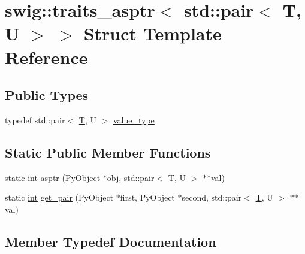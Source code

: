 \hypertarget{structswig_1_1traits__asptr_3_01std_1_1pair_3_01_t_00_01_u_01_4_01_4}{}\section{swig\+:\+:traits\+\_\+asptr$<$ std\+:\+:pair$<$ T, U $>$ $>$ Struct Template Reference}
\label{structswig_1_1traits__asptr_3_01std_1_1pair_3_01_t_00_01_u_01_4_01_4}
\subsection*{Public Types}
\begin{DoxyCompactItemize}
\item 
typedef std\+::pair$<$ \hyperlink{fmt_8h_a0acb682b8260ab1c60b918599864e2e5}{T}, U $>$ \hyperlink{structswig_1_1traits__asptr_3_01std_1_1pair_3_01_t_00_01_u_01_4_01_4_a1cc2b1f24022176235ac0ede7646c041}{value\+\_\+type}
\end{DoxyCompactItemize}
\subsection*{Static Public Member Functions}
\begin{DoxyCompactItemize}
\item 
static \hyperlink{lp__lib_8h_adeb9ec6400320e4923ac9d836d509ddb}{int} \hyperlink{structswig_1_1traits__asptr_3_01std_1_1pair_3_01_t_00_01_u_01_4_01_4_a331a484c8263c370bd86a3a2d655614a}{asptr} (Py\+Object $\ast$obj, std\+::pair$<$ \hyperlink{fmt_8h_a0acb682b8260ab1c60b918599864e2e5}{T}, U $>$ $\ast$$\ast$val)
\item 
static \hyperlink{lp__lib_8h_adeb9ec6400320e4923ac9d836d509ddb}{int} \hyperlink{structswig_1_1traits__asptr_3_01std_1_1pair_3_01_t_00_01_u_01_4_01_4_a7ba7929bef6f511c92ff9a847edf9bf0}{get\+\_\+pair} (Py\+Object $\ast$first, Py\+Object $\ast$second, std\+::pair$<$ \hyperlink{fmt_8h_a0acb682b8260ab1c60b918599864e2e5}{T}, U $>$ $\ast$$\ast$val)
\end{DoxyCompactItemize}


\subsection{Member Typedef Documentation}
\mbox{\label{structswig_1_1traits__asptr_3_01std_1_1pair_3_01_t_00_01_u_01_4_01_4_a1cc2b1f24022176235ac0ede7646c041}} 
